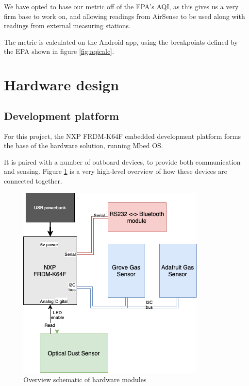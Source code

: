 \documentclass[sigconf, nonacm]{acmart}
\begin{document}
We have opted to base our metric off of the EPA's AQI, as this gives us a very firm base to work on,
and allowing readings from AirSense to be used along with readings from external measuring stations.

The metric is calculated on the Android app, using the breakpoints defined by the EPA shown in figure
\ref{fig:aqicalc}.

\section{Hardware design}

\subsection{Development platform}

For this project, the NXP FRDM-K64F embedded development platform forms the base of the
hardware solution, running Mbed OS. \cite{frdm_k64f}

It is paired with a number of outboard devices, to provide both communication and sensing.
Figure \ref{fig:hardwareschem} is a very high-level overview of how these devices are connected together.

\begin{figure}[h]
	\includegraphics[width=0.8\columnwidth]{hardware-schem.png}
	\caption{Overview schematic of hardware modules}
	\label{fig:hardwareschem}
\end{figure}
\end{document}
